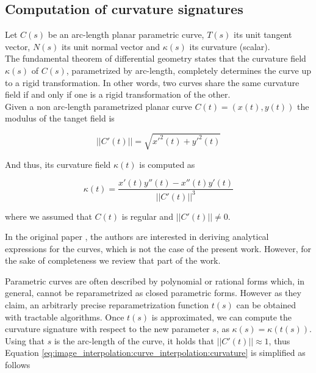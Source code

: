 \documentclass{ipol}
\begin{document}
\subsection{Computation of curvature signatures}
Let $C(s)$ be an arc-length planar parametric curve, $T(s)$ its unit tangent vector, $N(s)$ its unit normal vector and $\kappa (s)$ its curvature (scalar).\\

The fundamental theorem of differential geometry states that the curvature field $\kappa (s)$ of $C(s)$, parametrized by arc-length, completely determines the curve up to a rigid transformation. In other words, two curves share the same curvature field if and only if one is a rigid transformation of the other.\\

Given a non arc-length parametrized planar curve $C(t)=\left( x(t),y(t) \right)$ the modulus of the tanget field is

\begin{equation}
||C'(t)||=\sqrt{x'^2(t)+y'^2(t)}
\label{eq:image_interpolation:curve_interpolation:velocity}
\end{equation}

And thus, its curvature field $\kappa (t)$ is computed as

\begin{equation}
\kappa (t)=\frac{x'(t)y''(t)-x''(t)y'(t)}{||C'(t)||^3}
\label{eq:image_interpolation:curve_interpolation:curvature}
\end{equation}

where we assumed that $C(t)$ is regular and $||C'(t)||\neq 0$.

In the original paper \cite{im_proc:curve_interpolation:elber:07:metamorphosis_planar_parametric_curves}, the authors are interested in deriving analytical expressions for the curves, which is not the case of the present work. However, for the sake of completeness we review that part of the work.

Parametric curves are often described by polynomial or rational forms which, in general, cannot be reparametrized as closed parametric forms. However as they claim, an arbitrarly precise reparametrization function $t(s)$ can be obtained with tractable algorithms. 
Once $t(s)$ is approximated, we can compute the curvature signature with respect to the new parameter $s$, as $\kappa (s)=\kappa (t(s))$. Using that $s$ is the arc-length of the curve, it holds that $||C'(t)||\approx 1$, thus Equation \ref{eq:image_interpolation:curve_interpolation:curvature} is simplified as follows
\end{document}
